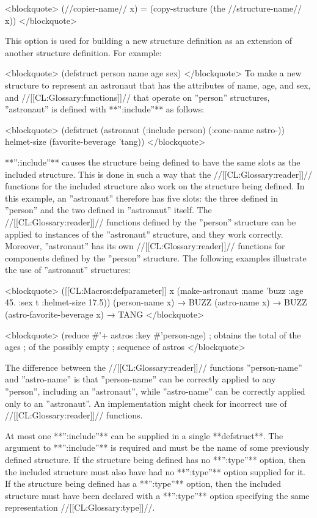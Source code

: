 <blockquote> (//copier-name// x) = (copy-structure (the //structure-name// x)) </blockquote>


This option is used for building a new structure definition as an extension of another structure definition. For example:

<blockquote> (defstruct person name age sex) </blockquote> To make a new structure to represent an astronaut that has the attributes of name, age, and sex, and //[[CL:Glossary:functions]]// that operate on ''person'' structures, ''astronaut'' is defined with **'':include''** as follows:

<blockquote> (defstruct (astronaut (:include person) (:conc-name astro-)) helmet-size (favorite-beverage 'tang)) </blockquote>

**'':include''** causes the structure being defined to have the same slots as the included structure. This is done in such a way that the //[[CL:Glossary:reader]]// functions for the included structure also work on the structure being defined. In this example, an ''astronaut'' therefore has five slots: the three defined in ''person'' and the two defined in ''astronaut'' itself. The //[[CL:Glossary:reader]]// functions defined by the ''person'' structure can be applied to instances of the ''astronaut'' structure, and they work correctly. Moreover, ''astronaut'' has its own //[[CL:Glossary:reader]]// functions for components defined by the ''person'' structure. The following examples illustrate the use of ''astronaut'' structures:

<blockquote> ([[CL:Macros:defparameter]] x (make-astronaut :name 'buzz :age 45. :sex t :helmet-size 17.5)) (person-name x) → BUZZ (astro-name x) → BUZZ (astro-favorite-beverage x) → TANG </blockquote>

<blockquote> (reduce #'+ astros :key #'person-age) ; obtains the total of the ages ; of the possibly empty ; sequence of astros </blockquote>

The difference between the //[[CL:Glossary:reader]]// functions ''person-name'' and ''astro-name'' is that ''person-name'' can be correctly applied to any ''person'', including an ''astronaut'', while ''astro-name'' can be correctly applied only to an ''astronaut''. An implementation might check for incorrect use of //[[CL:Glossary:reader]]// functions.

At most one **'':include''** can be supplied in a single **defstruct**. The argument to **'':include''** is required and must be the name of some previously defined structure. If the structure being defined has no **'':type''** option, then the included structure must also have had no **'':type''** option supplied for it. If the structure being defined has a **'':type''** option, then the included structure must have been declared with a **'':type''** option specifying the same representation //[[CL:Glossary:type]]//.

